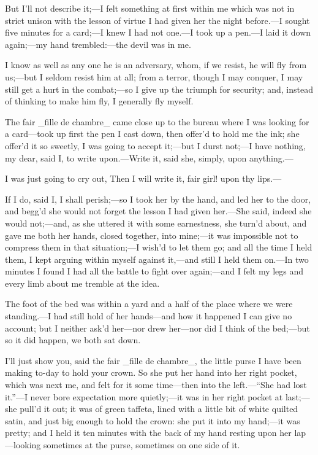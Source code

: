 \documentclass[twoside]{article}
\begin{document}
But I’ll not describe it;—I felt something at first within me which was
not in strict unison with the lesson of virtue I had given her the night
before.—I sought five minutes for a card;—I knew I had not one.—I took up
a pen.—I laid it down again;—my hand trembled:—the devil was in me.

I know as well as any one he is an adversary, whom, if we resist, he will
fly from us;—but I seldom resist him at all; from a terror, though I may
conquer, I may still get a hurt in the combat;—so I give up the triumph
for security; and, instead of thinking to make him fly, I generally fly
myself.

The fair _fille de chambre_ came close up to the bureau where I was
looking for a card—took up first the pen I cast down, then offer’d to
hold me the ink; she offer’d it so sweetly, I was going to accept it;—but
I durst not;—I have nothing, my dear, said I, to write upon.—Write it,
said she, simply, upon anything.—

I was just going to cry out, Then I will write it, fair girl! upon thy
lips.—

If I do, said I, I shall perish;—so I took her by the hand, and led her
to the door, and begg’d she would not forget the lesson I had given
her.—She said, indeed she would not;—and, as she uttered it with some
earnestness, she turn’d about, and gave me both her hands, closed
together, into mine;—it was impossible not to compress them in that
situation;—I wish’d to let them go; and all the time I held them, I kept
arguing within myself against it,—and still I held them on.—In two
minutes I found I had all the battle to fight over again;—and I felt my
legs and every limb about me tremble at the idea.

The foot of the bed was within a yard and a half of the place where we
were standing.—I had still hold of her hands—and how it happened I can
give no account; but I neither ask’d her—nor drew her—nor did I think of
the bed;—but so it did happen, we both sat down.

I’ll just show you, said the fair _fille de chambre_, the little purse I
have been making to-day to hold your crown.  So she put her hand into her
right pocket, which was next me, and felt for it some time—then into the
left.—“She had lost it.”—I never bore expectation more quietly;—it was in
her right pocket at last;—she pull’d it out; it was of green taffeta,
lined with a little bit of white quilted satin, and just big enough to
hold the crown: she put it into my hand;—it was pretty; and I held it ten
minutes with the back of my hand resting upon her lap—looking sometimes
at the purse, sometimes on one side of it.
\end{document}
